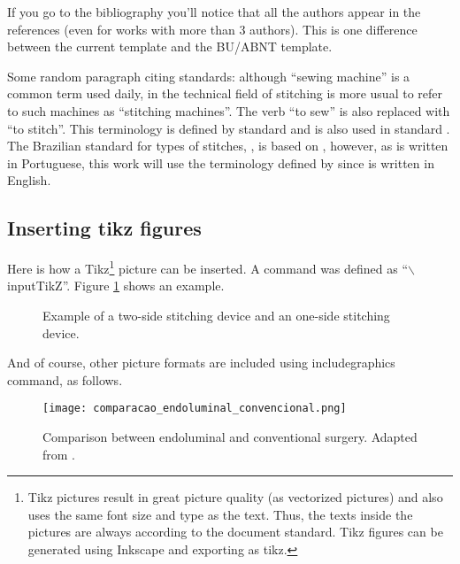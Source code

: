 If you go to the bibliography you'll notice that all the authors appear in the references (even for works with more than 3 authors). This is one difference between the current template and the BU/ABNT template.

Some random paragraph citing standards: although ``sewing machine'' is a common term used daily, in the technical field of stitching is more usual to refer to such machines as ``stitching machines''. The verb ``to sew'' is also replaced with ``to stitch''. This terminology is defined by standard  and is also used in standard . The Brazilian standard for types of stitches, , is based on , however, as  is written in Portuguese, this work will use the terminology defined by  since  is written in English.

\subsection{Inserting tikz figures}

Here is how a Tikz\footnote{Tikz pictures result in great picture quality (as vectorized pictures) and also uses the same font size and type as the text. Thus, the texts inside the pictures are always according to the document standard. Tikz figures can be generated using Inkscape and exporting as tikz.} picture can be inserted. A command was defined as ``$\backslash$inputTikZ''. Figure \ref{figura:two-one_side_device} shows an example.

\begin{figure}[h]
\centering
{}
\caption{Example of a two-side stitching device and an one-side stitching device.}
\label{figura:two-one_side_device}
\end{figure}

And of course, other picture formats are included using includegraphics command, as follows.

\begin{figure}[h]
\centering
\texttt{[image: comparacao\_endoluminal\_convencional.png]}
\caption{Comparison between endoluminal and conventional surgery. Adapted from .}
\label{figura:comparacao_endoluminal_convencional}
\end{figure}

